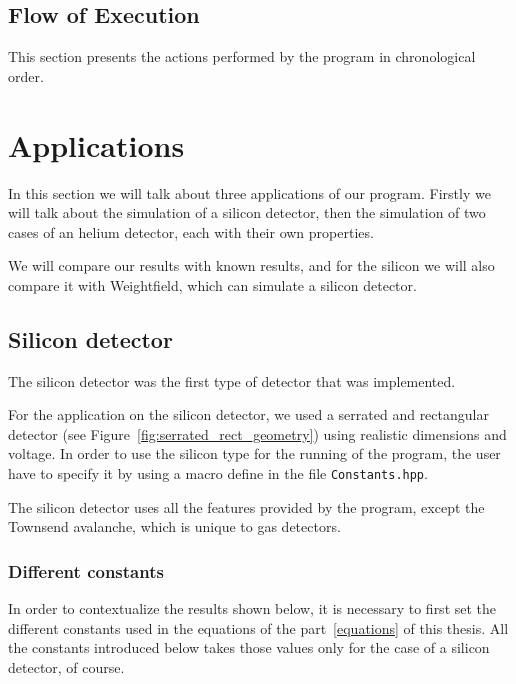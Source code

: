 \documentclass[11pt]{article}
\begin{document}
	\subsection{Flow of Execution}

		This section presents the actions performed by the program in chronological
		order.




\section{Applications}

	In this section we will talk about three applications of our program.
	Firstly we will talk about the simulation of a silicon detector, then the
	simulation of two cases of an helium detector, each with their own properties.

	We will compare our results with known results, and for the silicon we will also
	compare it with Weightfield, which can simulate a silicon detector.

	\subsection{Silicon detector}

		The silicon detector was the first type of detector that was implemented.

		For the application on the silicon detector, we used a serrated and rectangular detector
		(see Figure~\ref{fig:serrated_rect_geometry}) using realistic dimensions and voltage.
		In order to use the silicon type for the running of the program, the user have to specify
		it by using a macro define in the file \texttt{Constants.hpp}.

		The silicon detector uses all the features provided by the program, except the Townsend
		avalanche, which is unique to gas detectors.

		\subsubsection*{Different constants}

			In order to contextualize the results shown below, it is necessary to first set the
			different constants used in the equations of the part~\ref{equations} of this thesis.
			All the constants introduced below takes those values only for the case of a silicon
			detector, of course.
\end{document}
